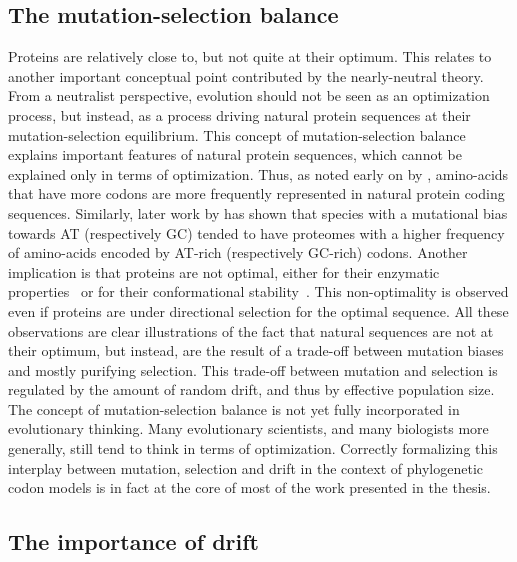 \subsection{The mutation-selection balance}
\label{subsec:the-mutation-selection-balance}

Proteins are relatively close to, but not quite at their optimum.
This relates to another important conceptual point contributed by the nearly-neutral theory.
From a neutralist perspective, evolution should not be seen as an optimization process, but instead, as a process driving natural protein sequences at their mutation-selection equilibrium.
This concept of mutation-selection balance explains important features of natural protein sequences, which cannot be explained only in terms of optimization.
Thus, as noted early on by \citet{King1969}, amino-acids that have more codons are more frequently represented in natural protein coding sequences.
Similarly, later work by \citet{Singer2000} has shown that species with a mutational bias towards AT (respectively GC) tended to have proteomes with a higher frequency of amino-acids encoded by AT-rich (respectively GC-rich) codons.
Another implication is that proteins are not optimal, either for their enzymatic properties~\citep{Cornish-Bowden1976,Albery1976,Hartl1985} or for their conformational stability~\citep{Taverna2002}.
This non-optimality is observed even if proteins are under directional selection for the optimal sequence.
All these observations are clear illustrations of the fact that natural sequences are not at their optimum, but instead, are the result of a trade-off between mutation biases and mostly purifying selection.
This trade-off between mutation and selection is regulated by the amount of random drift, and thus by effective population size.
The concept of mutation-selection balance is not yet fully incorporated in evolutionary thinking.
Many evolutionary scientists, and many biologists more generally, still tend to think in terms of optimization.
Correctly formalizing this interplay between mutation, selection and drift in the context of phylogenetic codon models is in fact at the core of most of the work presented in the thesis.

\subsection{The importance of drift}
\label{subsec:importance-of-drift}

